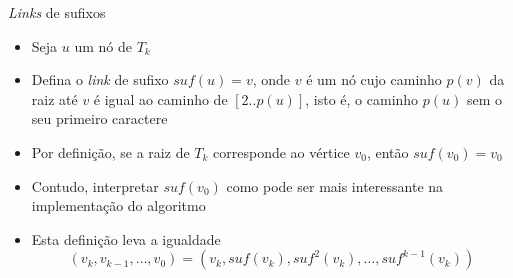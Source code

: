 \begin{frame}[fragile]{{\it Links} de sufixos}

    \begin{itemize}
        \item Seja $u$ um nó de $T_k$
        \pause

        \item Defina o \textit{link} de sufixo $suf(u) = v$, onde $v$ é um nó cujo caminho 
            $p(v)$ da raiz até $v$ é igual 
            ao caminho de $[2..p(u)]$, isto é, o caminho $p(u)$ sem o seu primeiro caractere
        \pause

        \item Por definição, se a raiz de $T_k$ corresponde ao vértice $v_0$, então 
            $suf(v_0) = v_0$
        \pause

        \item Contudo, interpretar $suf(v_0)$ como  pode ser mais 
            interessante na implementação do algoritmo
        \pause

        \item Esta definição leva a igualdade
        \[
            (v_k, v_{k-1}, \ldots, v_0) = (v_k, suf(v_k), suf^2(v_k), \ldots, suf^{k - 1}(v_k))
        \]

    \end{itemize}

\end{frame}


